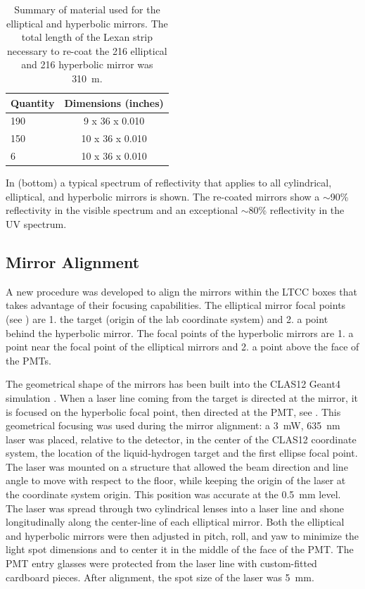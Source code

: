 \begin{table}
	\begin{center}
		\begin{tabular}{| l | c |}
			\hline \hline
			Quantity  & Dimensions (inches) \\
			\hline
			190       & 9  x 36 x 0.010  \\
			150       & 10 x 36 x 0.010  \\
			6         & 10 x 36 x 0.010  \\
			\hline \hline
		\end{tabular}
	\end{center}
	\caption{Summary of material used for the elliptical and hyperbolic mirrors. The total length of the Lexan
          strip necessary to re-coat the 216 elliptical and 216 hyperbolic mirror was 310~m.}\label{tab:strips}
\end{table}

In  (bottom) a typical spectrum of reflectivity that applies to all cylindrical, elliptical,
and hyperbolic mirrors is shown. The re-coated mirrors show a $\sim$90\% reflectivity in the visible spectrum and
an exceptional $\sim$80\% reflectivity in the UV spectrum.

\subsection{Mirror Alignment}

A new procedure was developed to align the mirrors within the LTCC boxes that takes advantage of their focusing capabilities.
The elliptical mirror focal points (see ) are 1. the target (origin of the lab coordinate system)
and 2. a point behind the hyperbolic mirror. The focal points of the hyperbolic mirrors are 1. a point near the focal point of the elliptical mirrors and
2. a point above the face of the PMTs.

The geometrical shape of the mirrors has been built into the CLAS12 Geant4 simulation \cite{sim-nim}.
When a laser line coming from the target is directed at the mirror,
it is focused on the hyperbolic focal point, then directed at the PMT, see .
This geometrical focusing was used during the mirror alignment: a 3~mW, 635~nm laser was placed, relative to the
detector,
in the center of the CLAS12 coordinate system, the location of the liquid-hydrogen target and the first ellipse focal point.
The laser was mounted on a structure that allowed the beam direction and line angle to move with respect to the floor, while keeping the origin of the laser at the coordinate system origin.
This position was accurate at the 0.5~mm level. The laser was spread through two cylindrical lenses into a laser line
and shone
longitudinally along the center-line of each elliptical mirror. Both the elliptical and hyperbolic mirrors were then
adjusted in pitch, roll, and yaw to minimize the light spot dimensions and to center it in the middle of the face of the PMT.
The PMT entry glasses were protected from the laser line with custom-fitted cardboard pieces. After alignment, the spot size of the laser was 5~mm.


